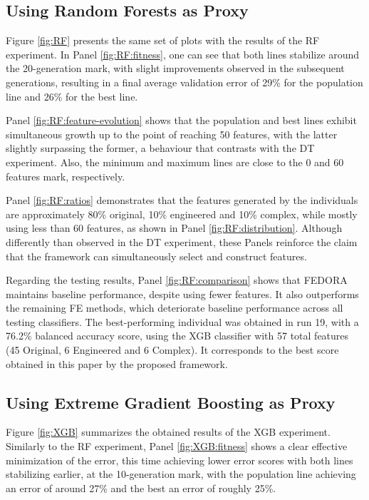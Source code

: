 
\subsection{Using Random Forests as Proxy}

Figure \ref{fig:RF} presents the same set of plots with the results of the RF experiment. In Panel \ref{fig:RF:fitness}, one can see that both lines stabilize around the 20-generation mark, with slight improvements observed in the subsequent generations, resulting in a final average validation error of 29\% for the population line and 26\% for the best line.

Panel \ref{fig:RF:feature-evolution} shows that the population and best lines exhibit simultaneous growth up to the point of reaching 50 features, with the latter slightly surpassing the former, a behaviour that contrasts with the \gls{DT} experiment. Also, the minimum and maximum lines are close to the 0 and 60 features mark, respectively.

Panel \ref{fig:RF:ratios} demonstrates that the features generated by the individuals are approximately 80\% original, 10\% engineered and 10\% complex, while mostly using less than 60 features, as shown in Panel \ref{fig:RF:distribution}. Although differently than observed in the \gls{DT} experiment, these Panels reinforce the claim that the framework can simultaneously select and construct features.

Regarding the testing results, Panel \ref{fig:RF:comparison} shows that FEDORA maintains baseline performance, despite using fewer features. It also outperforms the remaining \gls{FE} methods, which deteriorate baseline performance across all testing classifiers. The best-performing individual was obtained in run 19, with a 76.2\% balanced accuracy score, using the \gls{XGB} classifier with 57 total features (45 Original, 6 Engineered and 6 Complex). It corresponds to the best score obtained in this paper by the proposed framework.



\subsection{Using Extreme Gradient Boosting as Proxy}

Figure \ref{fig:XGB} summarizes the obtained results of the \gls{XGB} experiment. Similarly to the RF experiment, Panel \ref{fig:XGB:fitness} shows a clear effective minimization of the error, this time achieving lower error scores with both lines stabilizing earlier, at the 10-generation mark, with the population line achieving an error of around 27\% and the best an error of roughly 25\%.

